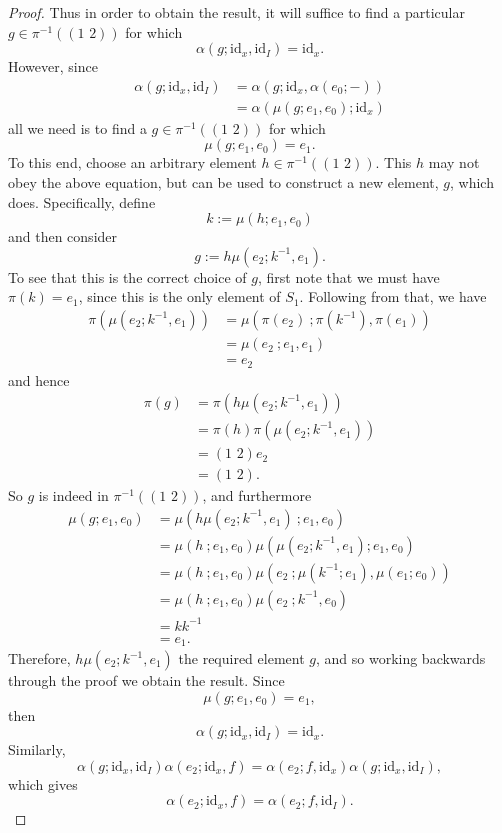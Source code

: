 \documentclass{amsbook} %
\newcommand{\id}{\textrm{id}}
\newcommand{\trans}[2]{( #1 \, \, #2 )}
\numberwithin{section}{chapter}
\begin{document}
\begin{proof}
Thus in order to obtain the result, it will suffice to find a particular $g \in \pi^{-1}(\trans{1}{2})$ for which
  \[
    \alpha(g; \id_x, \id_I) = \id_x.
  \]
However, since
  \begin{align*}
  		\alpha(  g  ;  \id_x,  \id_I  ) &= \alpha(  g  ;  \id_x,  \alpha( e_0; - )  ) \\
  		&= \alpha(  \mu(g; e_1, e_0)  ;  \id_x  )
		\end{align*}
all we need is to find a $g \in \pi^{-1}(\trans{1}{2})$ for which
  \[
    \mu(g; e_1, e_0) = e_1.
  \]
To this end, choose an arbitrary element $h \in \pi^{-1}(\trans{1}{2})$. This $h$ may not obey the above equation, but can be used to construct a new element, $g$, which does. Specifically, define
  \[
    k := \mu(h; e_1, e_0 )
  \]
and then consider
  \[
    g := h\mu\left(e_2; k^{-1}, e_1\right).
  \] 
To see that this is the correct choice of $g$, first note that we must have \( \pi(k) = e_1 \), since this is the only element of $S_1$. Following from that, we have 
  \begin{align*}
  	\pi \left(  \mu(e_2; k^{-1}, e_1)  \right) &= \mu \left(  \pi(e_2) \ ;  \pi\left(k^{-1}\right),  \pi(e_1)  \right) \\
  	&= \mu \left(  e_2  \ ;  e_1,  e_1  \right) \\
  	&= e_2
  \end{align*}
and hence
  \begin{align*}
		\pi(g) &= \pi \left(h \mu\left(e_2; k^{-1}, e_1\right) \right) \\
		       &= \pi(h) \pi \left(\mu\left(e_2; k^{-1}, e_1\right) \right) \\
		       &= \trans{1}{2} e_2 \\
		       &= \trans{1}{2}.
  \end{align*}
So $g$ is indeed in $\pi^{-1}(\trans{1}{2})$, and furthermore
  \begin{align*}
  	\mu(g; e_1, e_0) & = \mu \left(  h \mu\left(e_2; k^{-1}, e_1\right) \ ;  e_1,  e_0  \right) \\
                  	 &= \mu(  h \ ;  e_1,  e_0  ) \mu \left(  \mu\left(e_2; k^{-1}, e_1\right) ;  e_1,  e_0   \right) \\
                  	 &= \mu(  h \ ;  e_1,  e_0  ) \mu \left(  e_2 \ ;  \mu\left(k^{-1}; e_1\right),  \mu(e_1;  e_0)  \right) \\
                  	 &= \mu(  h \ ;  e_1,  e_0  ) \mu\left(  e_2 \ ;  k^{-1}, e_0  \right) \\
                  	 &= k k^{-1} \\
                  	 &= e_1.
  \end{align*}
Therefore, $h \mu\left(e_2; k^{-1}, e_1\right)$ the required element $g$, and so working backwards through the proof we obtain the result. Since
  \[
    \mu(g; e_1, e_0) = e_1,
  \]
then
  \[
    \alpha(g;\id_x, \id_I) = \id_x.
  \]
Similarly,
  \[
    \alpha(g;\id_x, \id_I) \alpha(e_2; \id_x, f) = \alpha(e_2; f, \id_x) \alpha(g; \id_x, \id_I),
  \]
which gives
  \[
    \alpha(e_2; \id_x, f) = \alpha(e_2; f, \id_I).
  \]

\end{proof} 
\end{document}
